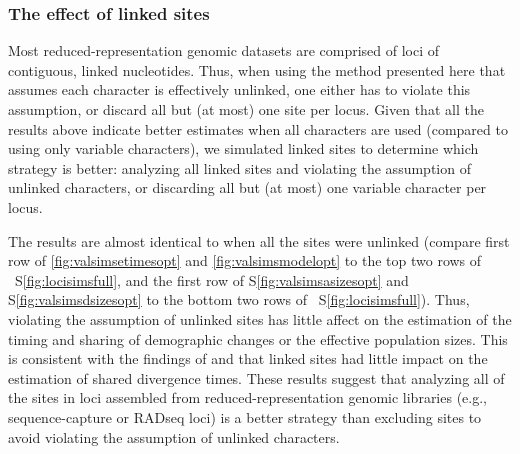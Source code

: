 \ifembed{

}{}


\subsubsection{The effect of linked sites}

Most reduced-representation genomic datasets are comprised of loci of
contiguous, linked nucleotides.
Thus, when using the method presented here that assumes each character is
effectively unlinked,
one either has to violate this assumption, or discard all but (at most) one
site per locus.
Given that all the results above indicate better estimates when all
characters are used (compared to using only variable characters), we
simulated linked sites to determine which strategy is better:
analyzing all linked sites and violating the assumption of unlinked characters,
or discarding all but (at most) one variable character per locus.

The results are almost identical to when all the sites were unlinked
(compare first row of
\figs
\ref{fig:valsimsetimesopt}
and
\ref{fig:valsimsmodelopt}
to the top two rows of
\fig{}~S\ref{fig:locisimsfull},
and the first row of
\figs
S\ref{fig:valsimsasizesopt}
and
S\ref{fig:valsimsdsizesopt}
to the bottom two rows of
\fig{}~S\ref{fig:locisimsfull}).
Thus, violating the assumption of unlinked sites has little
affect on the estimation of the timing and sharing of
demographic changes or the effective population sizes.
This is consistent with the findings of
\citet{Oaks2018ecoevolity} and
\citet{Oaks2018paic}
that linked sites had little impact on the estimation of
shared divergence times.
These results suggest that analyzing all of the sites in loci assembled from
reduced-representation genomic libraries (e.g., sequence-capture or RADseq
loci) is a better strategy than excluding sites to avoid violating the
assumption of unlinked characters.

